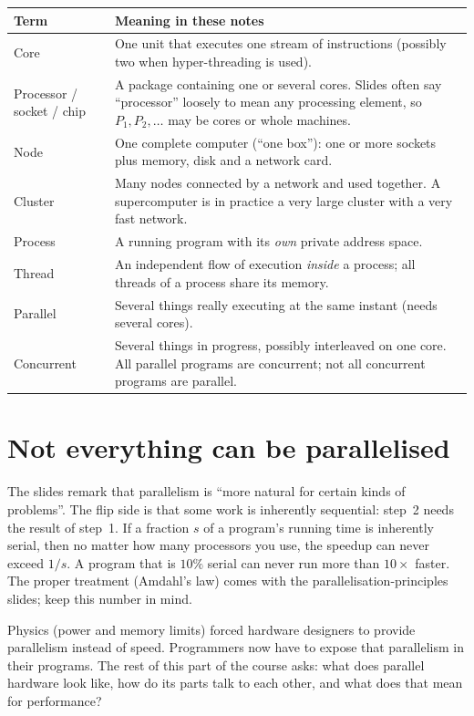 \begin{center}
\begin{tabularx}{\linewidth}{@{}l X@{}}
\toprule
\textbf{Term} & \textbf{Meaning in these notes}\\
\midrule
Core & One unit that executes one stream of instructions (possibly two when hyper-threading is used).\\
Processor / socket / chip & A package containing one or several cores. Slides often say ``processor''
  loosely to mean any processing element, so $P_1, P_2,\ldots$ may be cores or whole machines.\\
Node & One complete computer (``one box''): one or more sockets plus memory, disk and a network card.\\
Cluster & Many nodes connected by a network and used together. A supercomputer is in practice a very large cluster
  with a very fast network.\\
Process & A running program with its \emph{own} private address space.\\
Thread & An independent flow of execution \emph{inside} a process; all threads of a process share its memory.\\
Parallel & Several things really executing at the same instant (needs several cores).\\
Concurrent & Several things in progress, possibly interleaved on one core. All parallel programs are
  concurrent; not all concurrent programs are parallel.\\
\bottomrule
\end{tabularx}
\end{center}

\section{Not everything can be parallelised}

The slides remark that parallelism is ``more natural for certain kinds of problems''. The flip side is that
some work is inherently sequential: step~2 needs the result of step~1. If a fraction $s$ of a
program's running time is inherently serial, then no matter how many processors you use, the
speedup can never exceed $1/s$. A program that is $10\%$ serial can never run more than $10\times$
faster. The proper treatment (Amdahl's law) comes with the parallelisation-principles slides; keep this
number in mind.

\begin{keyidea}
Physics (power and memory limits) forced hardware designers to provide parallelism instead of
speed. Programmers now have to expose that parallelism in their programs. The rest of this part of the
course asks: what does parallel hardware look like, how do its parts talk to each other, and what does
that mean for performance?
\end{keyidea}

